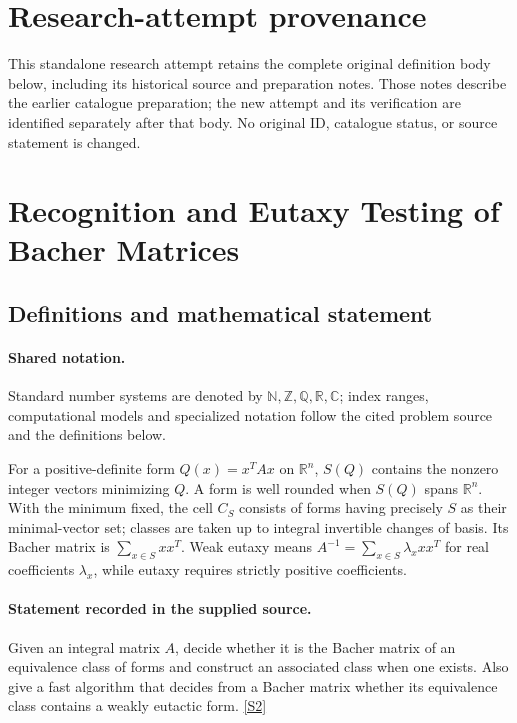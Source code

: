 \documentclass[11pt]{article}
\begin{document}
\section*{Research-attempt provenance}
This standalone research attempt retains the complete original definition body below,
including its historical source and preparation notes. Those notes describe the
earlier catalogue preparation; the new attempt and its verification are identified
separately after that body. No original ID, catalogue status, or source statement is changed.

\section{Recognition and Eutaxy Testing of Bacher Matrices}\label{statement}

\subsection{Definitions and mathematical statement}

\paragraph{Shared notation.}Standard number systems are denoted by $\mathbb N,\mathbb Z,\mathbb Q,\mathbb R,\mathbb C$; index ranges, computational models and specialized notation follow the cited problem source and the definitions below.


For a positive-definite form $Q(x)=x^TAx$ on $\mathbb R^n$, $S(Q)$ contains the nonzero integer vectors minimizing $Q$. A form is well rounded when $S(Q)$ spans $\mathbb R^n$. With the minimum fixed, the cell $C_S$ consists of forms having precisely $S$ as their minimal-vector set; classes are taken up to integral invertible changes of basis. Its Bacher matrix is $\sum_{x\in S}xx^T$. Weak eutaxy means $A^{-1}=\sum_{x\in S}\lambda_xxx^T$ for real coefficients $\lambda_x$, while eutaxy requires strictly positive coefficients.
\paragraph{Statement recorded in the supplied source.}
Given an integral matrix $A$, decide whether it is the Bacher matrix of an equivalence class of forms and construct an associated class when one exists. Also give a fast algorithm that decides from a Bacher matrix whether its equivalence class contains a weakly eutactic form. \href{https://doi.org/10.4171/owr/2005/01}{[S2]}
\end{document}
